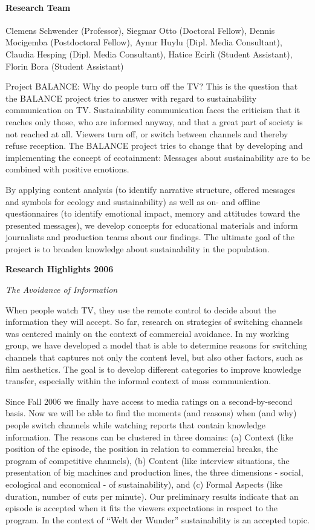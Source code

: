 
\paragraph{Research Team}
Clemens Schwender (Professor), Siegmar Otto (Doctoral Fellow), Dennis Mocigemba (Postdoctoral Fellow), Aynur Huylu (Dipl. Media Consultant), Claudia Hesping (Dipl. Media Consultant), Hatice Ecirli (Student Assistant), Florin Bora (Student Assistant)

 Project BALANCE: Why do people turn off the TV? This is the question that the BALANCE project tries to answer with regard to sustainability communication on TV. Sustainability communication faces the criticism that it reaches only those, who are informed anyway, and that a great part of society is not reached at all. Viewers turn off, or switch between channels and thereby refuse reception. The BALANCE project tries to change that by developing and implementing the concept of ecotainment: Messages about sustainability are to be combined with positive emotions.

 By applying content analysis (to identify narrative structure, offered messages and symbols for ecology and sustainability) as well as on- and offline questionnaires (to identify emotional impact, memory and attitudes toward the presented messages), we develop concepts for educational materials and inform journalists and production teams about our findings. The ultimate goal of the project is to broaden knowledge about sustainability in the population.

\null
\textbf{Research Highlights 2006}

\textit{The Avoidance of Information}

 When people watch TV, they use the remote control to decide about the information they will accept. So far, research on strategies of switching channels was centered mainly on the context of commercial avoidance. In my working group, we have developed a model that is able to determine reasons for switching channels that captures not only the content level, but also other factors, such as film aesthetics. The goal is to develop different categories to improve knowledge transfer, especially within the informal context of mass communication.

 Since Fall 2006 we finally have access to media ratings on a second-by-second basis. Now we will be able to find the moments (and reasons) when (and why) people switch channels while watching reports that contain knowledge information. The reasons can be clustered in three domains: (a) Context (like position of the episode, the position in relation to commercial breaks, the program of competitive channels), (b) Content (like interview situations, the presentation of big machines and production lines, the three dimensions - social, ecological and economical - of sustainability), and (c) Formal Aspects (like duration, number of cuts per minute). Our preliminary results indicate that an episode is accepted when it fits the viewers expectations in respect to the program. In the context of ``Welt der Wunder'' sustainability is an accepted topic. 


